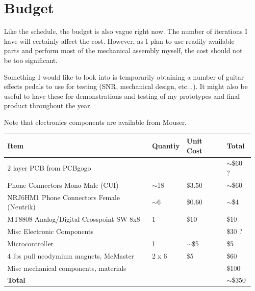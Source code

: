 \documentclass{article}
\begin{document}
\section{Budget}

Like the schedule, the budget is also vague right now.  The number of iterations I have will certainly affect the cost.  However, as I plan to use readily available parts and perform most of the mechanical assembly myself, the cost should not be too significant.

Something I would like to look into is temporarily obtaining a number of guitar effects pedals to use for testing (SNR, mechanical design, etc...).  It might also be useful to have these for demonstrations and testing of my prototypes and final product throughout the year.

Note that electronics components are available from Mouser.

\begin{table}[h!]
\begin{tabular}{llll}
Item                     & Quantiy & Unit Cost & Total      \\
\hline
2 layer PCB from PCBgogo                    &         &           & $\sim$\$60 ?    \\
Phone Connectors Mono Male (CUI)            & $\sim$18     & \$3.50    & $\sim$\$60 \\
NRJ6HM1 Phone Connectors Female (Neutrik)   & $\sim$6      & \$0.60    & $\sim$\$4  \\
MT8808 Analog/Digital Crosspoint SW 8x8     & 1       & \$10      & \$10            \\
Misc Electronic Components                  &         &           & \$30 ?          \\
Microcontroller                             & 1       & $\sim$\$5 & \$5             \\
4 lbs pull neodymium magnets, McMaster      & 2 x 6   & \$5       & \$60            \\
Misc mechanical components, materials       &         &           & \$100           \\
\textbf{Total}                              &         &           &  $\sim$\$350    \\
\end{tabular}
\end{table}

\newpage


\end{document}
